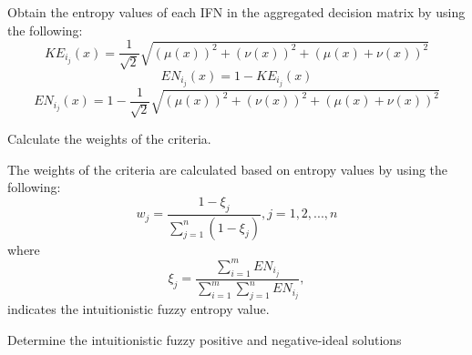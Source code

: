 \begin{flushleft}
\begin{steps}
\item Obtain the entropy values\cite{1} of each IFN in the
aggregated decision matrix by using the following:
\begin{equation}
    KE_i_j(x)=\frac{1}{\sqrt{2}} \sqrt{(\mu(x))^2 +(\nu(x))^2+(\mu(x)+\nu(x))^2}
\end{equation}
\begin{equation*}
    EN_i_j(x)=1-KE_i_j(x)
\end{equation*}
\begin{equation}
    EN_i_j(x) =1-\frac{1}{\sqrt{2}} \sqrt{(\mu(x))^2 +(\nu(x))^2+(\mu(x)+\nu(x))^2}
\end{equation}

\item Calculate the weights of the criteria. 

The weights of the criteria
are calculated based on entropy values by using the following:
\begin{equation}
    w_j=\frac{1-\xi_j}{\sum_{j=1}^{n}(1-\xi_j)},
    j=1,2,...,n
\end{equation}
where
\begin{equation}
     \xi_j=\frac{\sum_{i=1}^{m} EN_i_j}{\sum_{i=1}^{m}\sum_{j=1}^{n} EN_i_j},
\end{equation}
indicates the intuitionistic fuzzy entropy value.



\item Determine the intuitionistic fuzzy positive and
negative-ideal solutions


\end{steps}
\end{flushleft}
